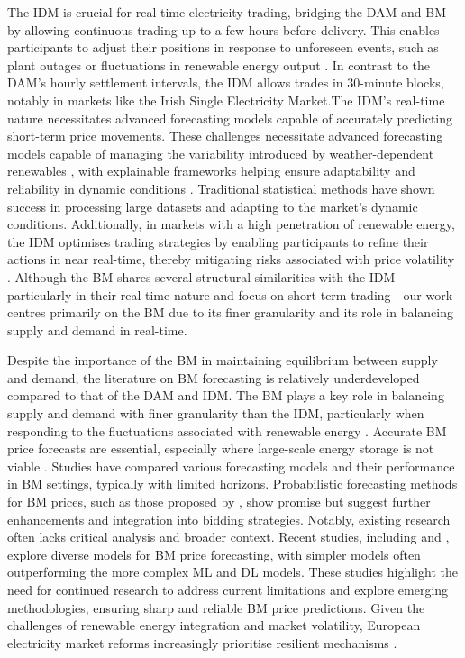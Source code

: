 The IDM is crucial for real-time electricity trading, bridging the DAM and BM by allowing continuous trading up to a few hours before delivery. This enables participants to adjust their positions in response to unforeseen events, such as plant outages or fluctuations in renewable energy output \cite{shinde2019literature}. In contrast to the DAM's hourly settlement intervals, the IDM allows trades in 30-minute blocks, notably in markets like the Irish Single Electricity Market.The IDM's real-time nature necessitates advanced forecasting models capable of accurately predicting short-term price movements. These challenges necessitate advanced forecasting models capable of managing the variability introduced by weather-dependent renewables \cite{piantadosi2024photovoltaic}, with explainable frameworks helping ensure adaptability and reliability in dynamic conditions \cite{samarajeewa2024artificial}. Traditional statistical methods \cite{uniejewski2019understanding, narajewski2020econometric} have shown success in processing large datasets and adapting to the market's dynamic conditions. Additionally, in markets with a high penetration of renewable energy, the IDM optimises trading strategies by enabling participants to refine their actions in near real-time, thereby mitigating risks associated with price volatility \cite{koch2019short, birkeland2024research}. Although the BM shares several structural similarities with the IDM—particularly in their real-time nature and focus on short-term trading—our work centres primarily on the BM due to its finer granularity and its role in balancing supply and demand in real-time.

Despite the importance of the BM in maintaining equilibrium between supply and demand, the literature on BM forecasting is relatively underdeveloped compared to that of the DAM and IDM. The BM plays a key role in balancing supply and demand with finer granularity than the IDM, particularly when responding to the fluctuations associated with renewable energy \cite{ortner2019future}. Accurate BM price forecasts are essential, especially where large-scale energy storage is not viable \cite{MAZZI2017259}. Studies have compared various forecasting models and their performance in BM settings, typically with limited horizons. Probabilistic forecasting methods for BM prices, such as those proposed by \cite{dumas2019probabilistic}, show promise but suggest further enhancements and integration into bidding strategies. Notably, existing research often lacks critical analysis and broader context. Recent studies, including \cite{narajewski2022probabilistic} and \cite{OCONNOR2024101436}, explore diverse models for BM price forecasting, with simpler models often outperforming the more complex ML and DL models. These studies highlight the need for continued research to address current limitations and explore emerging methodologies, ensuring sharp and reliable BM price predictions. Given the challenges of renewable energy integration and market volatility, European electricity market reforms increasingly prioritise resilient mechanisms \cite{zachmann2023design}.





